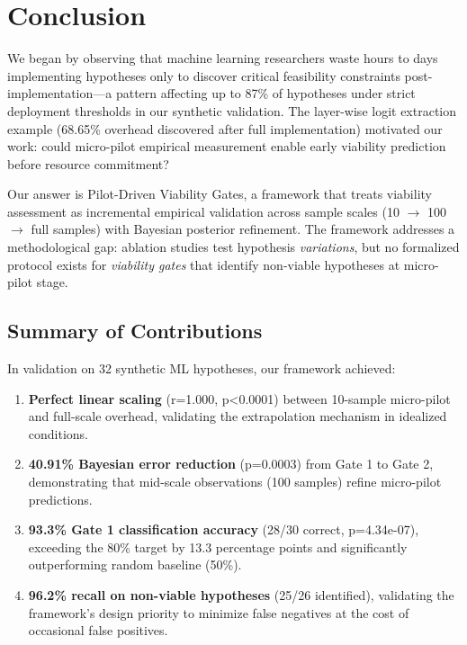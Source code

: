 \section{Conclusion}

We began by observing that machine learning researchers waste hours to days implementing hypotheses only to discover critical feasibility constraints post-implementation---a pattern affecting up to 87\% of hypotheses under strict deployment thresholds in our synthetic validation. The layer-wise logit extraction example (68.65\% overhead discovered after full implementation) motivated our work: could micro-pilot empirical measurement enable early viability prediction before resource commitment?

Our answer is Pilot-Driven Viability Gates, a framework that treats viability assessment as incremental empirical validation across sample scales (10 $\rightarrow$ 100 $\rightarrow$ full samples) with Bayesian posterior refinement. The framework addresses a methodological gap: ablation studies test hypothesis \textit{variations}, but no formalized protocol exists for \textit{viability gates} that identify non-viable hypotheses at micro-pilot stage.

\subsection{Summary of Contributions}

In validation on 32 synthetic ML hypotheses, our framework achieved:

\begin{enumerate}
\item \textbf{Perfect linear scaling} (r=1.000, p<0.0001) between 10-sample micro-pilot and full-scale overhead, validating the extrapolation mechanism in idealized conditions.

\item \textbf{40.91\% Bayesian error reduction} (p=0.0003) from Gate 1 to Gate 2, demonstrating that mid-scale observations (100 samples) refine micro-pilot predictions.

\item \textbf{93.3\% Gate 1 classification accuracy} (28/30 correct, p=4.34e-07), exceeding the 80\% target by 13.3 percentage points and significantly outperforming random baseline (50\%).

\item \textbf{96.2\% recall on non-viable hypotheses} (25/26 identified), validating the framework's design priority to minimize false negatives at the cost of occasional false positives.
\end{enumerate}

